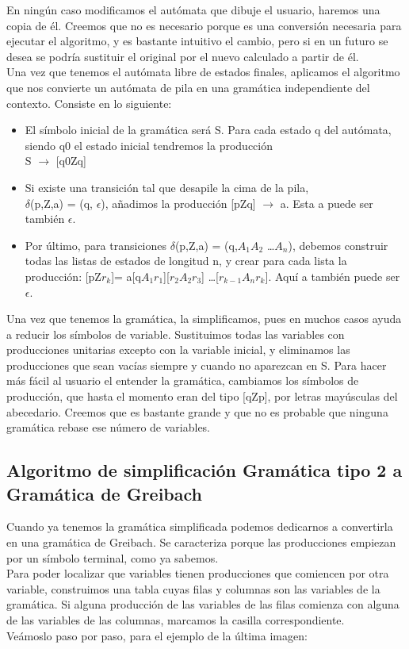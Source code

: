\documentclass[12pt,a4paper,spanish]{book}
\begin{document}
En ning\'un caso modificamos el aut\'omata que dibuje el usuario, haremos una copia de \'el. Creemos que no es necesario porque es una conversi\'on necesaria para ejecutar el algoritmo, y es bastante intuitivo el cambio, pero si en un futuro se desea se podr\'ia sustituir el original por el nuevo calculado a partir de \'el.\\
\newpage
Una vez que tenemos el aut\'omata libre de estados finales, aplicamos el algoritmo que nos convierte un aut\'omata de pila en una gram\'atica independiente del contexto. Consiste en lo siguiente:
\begin{itemize}
\item El s\'imbolo inicial de la gram\'atica ser\'a S. Para cada estado q del aut\'omata, siendo q0 el estado inicial tendremos la producci\'on\\ S $\rightarrow$ [q0Zq]
\item Si existe una transici\'on tal que desapile la cima de la pila,\\ $\delta$(p,Z,a) = (q, $\epsilon$),
a\~nadimos la producci\'on [pZq] $\rightarrow$ a. Esta a puede ser tambi\'en $\epsilon$.
\item Por \'ultimo, para transiciones $\delta$(p,Z,a) = (q,$A_{1}A_{2}$ \ldots $A_{n}$), debemos construir todas las listas de estados de longitud n, y crear para cada lista la producci\'on:
[pZ$r_{k}$]= a[q$A_{1}r_{1}$][$r_{2}A_{2}r_{3}$] \ldots [$r_{k-1}A_{n}r_{k}$]. Aqu\'i a tambi\'en puede ser $\epsilon$.
\end{itemize}
Una vez que tenemos la gram\'atica, la simplificamos, pues en muchos casos ayuda a reducir los s\'imbolos de variable. Sustituimos todas las variables con producciones unitarias excepto con la variable inicial, y eliminamos las producciones que sean vac\'ias siempre y cuando no aparezcan en S. Para hacer m\'as f\'acil al usuario el entender la gram\'atica, cambiamos los s\'imbolos de producci\'on, que hasta el momento eran del tipo [qZp], por letras may\'usculas del abecedario. Creemos que es bastante grande y que no es probable que ninguna gram\'atica rebase ese n\'umero de variables.
\newpage
\subsection{Algoritmo de simplificaci\'on Gram\'atica tipo 2 a Gram\'atica de Greibach}
Cuando ya tenemos la gram\'atica simplificada podemos dedicarnos a convertirla en una gram\'atica de Greibach. Se caracteriza porque las producciones empiezan por un s\'imbolo terminal, como ya sabemos.\\
Para poder localizar que variables tienen producciones que comiencen por otra variable, construimos una tabla cuyas filas y columnas son las variables de la gram\'atica. Si alguna producci\'on de las variables de las filas comienza con alguna de las variables de las columnas, marcamos la casilla correspondiente.\\
Ve\'amoslo paso por paso, para el ejemplo de la \'ultima imagen:\\
\end{document}

